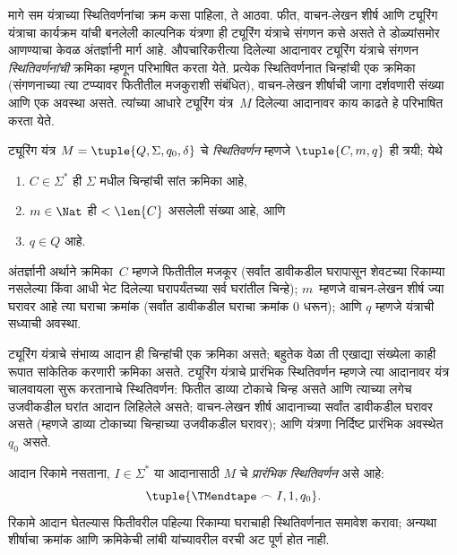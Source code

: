 \documentclass[../../../include/open-logic-section]{subfiles}
\begin{document}

\begin{explain}
मागे सम यंत्राच्या स्थितिवर्णनांचा क्रम कसा पाहिला, ते आठवा.
फीत, वाचन-लेखन शीर्ष आणि ट्यूरिंग यंत्राचा कार्यक्रम यांची बनलेली
काल्पनिक यंत्रणा ही ट्यूरिंग यंत्राचे संगणन कसे असते ते डोळ्यांसमोर
आणण्याचा केवळ अंतर्ज्ञानी मार्ग आहे. औपचारिकरीत्या दिलेल्या आदानावर
ट्यूरिंग यंत्राचे संगणन \emph{स्थितिवर्णनांची} क्रमिका म्हणून
परिभाषित करता येते. प्रत्येक स्थितिवर्णनात चिन्हांची एक क्रमिका
(संगणनाच्या त्या टप्प्यावर फितीतील मजकुराशी संबंधित), वाचन-लेखन
शीर्षाची जागा दर्शवणारी संख्या आणि एक अवस्था असते. त्यांच्या
आधारे ट्यूरिंग यंत्र~$M$ दिलेल्या आदानावर काय काढते हे परिभाषित
करता येते.
\end{explain}

\begin{defn}[स्थितिवर्णन]
ट्यूरिंग यंत्र $M = \tuple{Q, \Sigma, q_0,
\delta}$ चे \emph{स्थितिवर्णन} म्हणजे $\tuple{C, m, q}$ ही त्रयी;
येथे
\begin{enumerate}
\item $C \in \Sigma^*$ ही $\Sigma$ मधील चिन्हांची सांत क्रमिका आहे,
\item $m \in \Nat$ ही $< \len{C}$ असलेली संख्या आहे, आणि
\item $q \in Q$ आहे.
\end{enumerate}
अंतर्ज्ञानी अर्थाने क्रमिका~$C$ म्हणजे फितीतील मजकूर (सर्वांत
डावीकडील घरापासून शेवटच्या रिकाम्या नसलेल्या किंवा आधी भेट दिलेल्या
घरापर्यंतच्या सर्व घरांतील चिन्हे); $m$~म्हणजे वाचन-लेखन शीर्ष ज्या
घरावर आहे त्या घराचा क्रमांक (सर्वांत डावीकडील घराचा क्रमांक $0$
धरून); आणि $q$ म्हणजे यंत्राची सध्याची अवस्था.
\end{defn}

\begin{explain}
ट्यूरिंग यंत्राचे संभाव्य आदान ही चिन्हांची एक क्रमिका असते; बहुतेक
वेळा ती एखाद्या संख्येला काही रूपात सांकेतिक करणारी क्रमिका असते.
ट्यूरिंग यंत्राचे प्रारंभिक स्थितिवर्णन म्हणजे त्या आदानावर यंत्र
चालवायला सुरू करतानाचे स्थितिवर्णन: फितीत डाव्या टोकाचे चिन्ह असते
आणि त्याच्या लगेच उजवीकडील घरांत आदान लिहिलेले असते; वाचन-लेखन
शीर्ष आदानाच्या सर्वांत डावीकडील घरावर असते (म्हणजे डाव्या टोकाच्या
चिन्हाच्या उजवीकडील घरावर); आणि यंत्रणा निर्दिष्ट प्रारंभिक
अवस्थेत~$q_0$ असते.
%
\end{explain}

\begin{defn}[प्रारंभिक स्थितिवर्णन]
आदान रिकामे नसताना, $I \in \Sigma^*$ या आदानासाठी $M$ चे \emph{प्रारंभिक स्थितिवर्णन}
असे आहे:
\[
\tuple{\TMendtape \frown I, 1, q_0}.
\]
रिकामे आदान घेतल्यास फितीवरील पहिल्या रिकाम्या घराचाही
स्थितिवर्णनात समावेश करावा; अन्यथा शीर्षाचा क्रमांक आणि क्रमिकेची
लांबी यांच्यावरील वरची अट पूर्ण होत नाही.
%
\end{defn}
\end{document}
